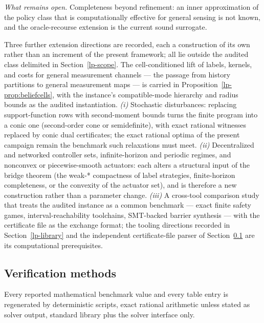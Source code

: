 \documentclass[10pt,twocolumn]{article}
\theoremstyle{plain}
\theoremstyle{definition}
\theoremstyle{remark}
\begin{document}
\emph{What remains open.} Completeness beyond refinement:
 an inner
approximation of the policy class that is computationally effective for
general sensing is not known, and the oracle-recourse extension is the
current sound surrogate.

Three further extension directions are recorded, each a construction of
its own rather than an increment of the present framework; all lie outside
the audited class delimited in Section~\ref{lp-scope}. The cell-conditioned
lift of labels, kernels, and costs for general measurement channels --- the
passage from history partitions to general measurement maps --- is carried
in Proposition~\ref{lp-prop:beliefcells}, with the instance's compatible-mode
hierarchy and radius bounds as the audited instantiation.
\emph{(i)} Stochastic disturbances: replacing support-function rows with
second-moment bounds turns the finite program into a conic one
(second-order cone or semidefinite), with exact rational witnesses
replaced by conic dual certificates; the exact rational optima of the
present campaign remain the benchmark such relaxations must meet.
\emph{(ii)} Decentralized and networked controller sets, infinite-horizon
and periodic regimes, and nonconvex or piecewise-smooth actuators: each
alters a structural input of the bridge theorem (the weak-* compactness
of label strategies, finite-horizon completeness, or the convexity of
the actuator set), and is therefore a new construction rather than a
parameter change.
\emph{(iii)} A cross-tool comparison study that treats the audited
instance as a common benchmark --- exact finite safety games,
interval-reachability toolchains, SMT-backed barrier synthesis --- with
the certificate file as the exchange format; the tooling directions
recorded in Section~\ref{lp-library} and the independent
certificate-file parser of Section~\ref{lp-methods} are its computational
prerequisites.

\subsection{Verification methods}\label{lp-methods}

Every reported mathematical benchmark value and every table entry is
regenerated by deterministic scripts, exact rational arithmetic unless
stated as solver output, standard library plus the solver interface only.
\end{document}
